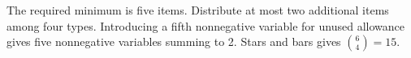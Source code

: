 The required minimum is five items. Distribute at most two additional items among four types. Introducing a fifth nonnegative variable for unused allowance gives five nonnegative variables summing to 2. Stars and bars gives $\binom{6}{4}=\boxed{15}$.
